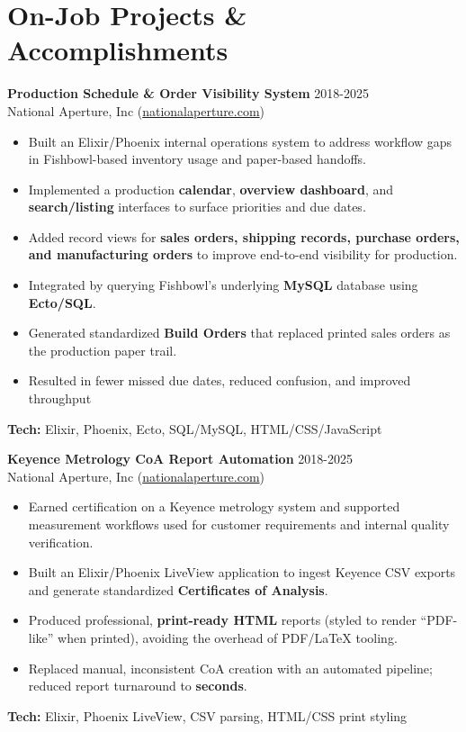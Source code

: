 \documentclass[11pt]{article}
\begin{document}
\section*{On-Job Projects \& Accomplishments}

\vspace{6pt}
\textbf{Production Schedule \& Order Visibility System} \hfill 2018-2025\\
National Aperture, Inc (\href{https://nationalaperture.com}{nationalaperture.com})
\vspace{2pt}
\begin{itemize}
  \item Built an Elixir/Phoenix internal operations system to address workflow gaps in Fishbowl-based inventory usage and paper-based handoffs.
  \item Implemented a production \textbf{calendar}, \textbf{overview dashboard}, and \textbf{search/listing} interfaces to surface priorities and due dates.
  \item Added record views for \textbf{sales orders, shipping records, purchase orders, and manufacturing orders} to improve end-to-end visibility for production.
  \item Integrated by querying Fishbowl's underlying \textbf{MySQL} database using \textbf{Ecto/SQL}.
  \item Generated standardized \textbf{Build Orders} that replaced printed sales orders as the production paper trail.
  \item Resulted in fewer missed due dates, reduced confusion, and improved throughput
\end{itemize}
\vspace{6pt}
\textbf{Tech:} Elixir, Phoenix, Ecto, SQL/MySQL, HTML/CSS/JavaScript

\vspace{12pt}

\vspace{6pt}
\textbf{Keyence Metrology CoA Report Automation} \hfill 2018-2025\\
National Aperture, Inc (\href{https://nationalaperture.com}{nationalaperture.com})
\vspace{2pt}
\begin{itemize}
  \item Earned certification on a Keyence metrology system and supported measurement workflows used for customer requirements and internal quality verification.
  \item Built an Elixir/Phoenix LiveView application to ingest Keyence CSV exports and generate standardized \textbf{Certificates of Analysis}.
  \item Produced professional, \textbf{print-ready HTML} reports (styled to render ``PDF-like'' when printed), avoiding the overhead of PDF/LaTeX tooling.
  \item Replaced manual, inconsistent CoA creation with an automated pipeline; reduced report turnaround to \textbf{seconds}.
\end{itemize}
\vspace{6pt}
\textbf{Tech:} Elixir, Phoenix LiveView, CSV parsing, HTML/CSS print styling
\end{document}

